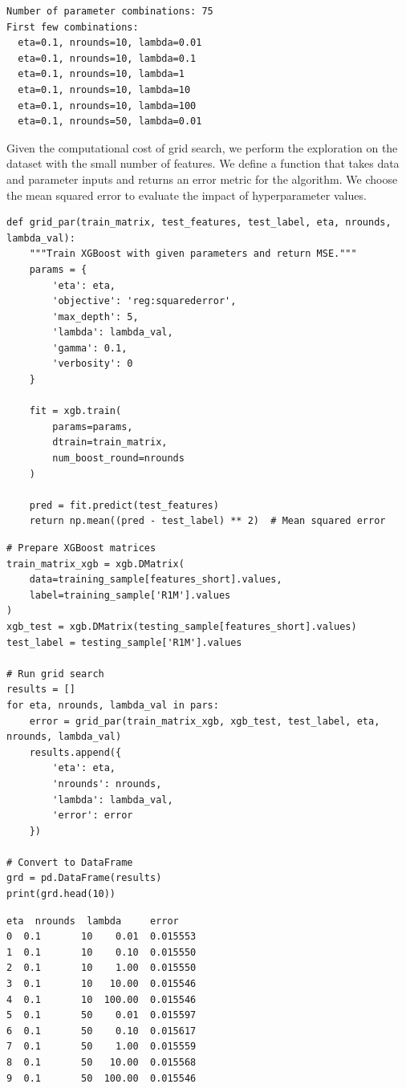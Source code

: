 \begin{verbatim}
Number of parameter combinations: 75
First few combinations:
  eta=0.1, nrounds=10, lambda=0.01
  eta=0.1, nrounds=10, lambda=0.1
  eta=0.1, nrounds=10, lambda=1
  eta=0.1, nrounds=10, lambda=10
  eta=0.1, nrounds=10, lambda=100
  eta=0.1, nrounds=50, lambda=0.01
\end{verbatim}

Given the computational cost of grid search, we perform the exploration on the dataset with the small number of features. We define a function that takes data and parameter inputs and returns an error metric for the algorithm. We choose the mean squared error to evaluate the impact of hyperparameter values.

\begin{verbatim}
def grid_par(train_matrix, test_features, test_label, eta, nrounds, lambda_val):
    """Train XGBoost with given parameters and return MSE."""
    params = {
        'eta': eta,
        'objective': 'reg:squarederror',
        'max_depth': 5,
        'lambda': lambda_val,
        'gamma': 0.1,
        'verbosity': 0
    }
    
    fit = xgb.train(
        params=params,
        dtrain=train_matrix,
        num_boost_round=nrounds
    )
    
    pred = fit.predict(test_features)
    return np.mean((pred - test_label) ** 2)  # Mean squared error
\end{verbatim}

\begin{verbatim}
# Prepare XGBoost matrices
train_matrix_xgb = xgb.DMatrix(
    data=training_sample[features_short].values,
    label=training_sample['R1M'].values
)
xgb_test = xgb.DMatrix(testing_sample[features_short].values)
test_label = testing_sample['R1M'].values

# Run grid search
results = []
for eta, nrounds, lambda_val in pars:
    error = grid_par(train_matrix_xgb, xgb_test, test_label, eta, nrounds, lambda_val)
    results.append({
        'eta': eta,
        'nrounds': nrounds,
        'lambda': lambda_val,
        'error': error
    })

# Convert to DataFrame
grd = pd.DataFrame(results)
print(grd.head(10))
\end{verbatim}

\begin{verbatim}
eta  nrounds  lambda     error
0  0.1       10    0.01  0.015553
1  0.1       10    0.10  0.015550
2  0.1       10    1.00  0.015550
3  0.1       10   10.00  0.015546
4  0.1       10  100.00  0.015546
5  0.1       50    0.01  0.015597
6  0.1       50    0.10  0.015617
7  0.1       50    1.00  0.015559
8  0.1       50   10.00  0.015568
9  0.1       50  100.00  0.015546
\end{verbatim}

